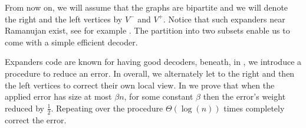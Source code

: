 \documentclass{beamer}
\begin{document}
\begin{frame}

  From now on, we will assume that the graphs are bipartite and we will denote the right and the left vertices by $V^{-}$ and $V^{+}$. Notice that such expanders near Ramanujan exist, see for example \cite{leverrier2022decodingquantumtannercodes}. The partition into two subsets enable us to come with a simple efficient decoder.

  Expanders code are known for having good decoders, beneath, in , we introduce a procedure to reduce an error. In overall, we alternately let to the right and then the left vertices to correct their own local view. In  we prove that when the applied error has size at most $\beta n$, for some constant $\beta$ then the error's weight reduced by $\frac{1}{2}$. Repeating over the procedure $\Theta(\log(n) )$ times completely correct the error. 

\end{frame}
\end{document}
